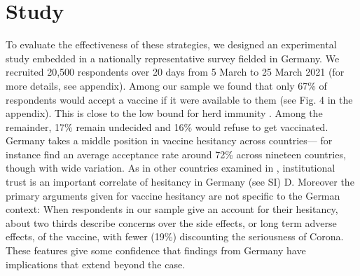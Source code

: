 \documentclass[12pt]{article}
\renewcommand\hl[1]{#1}
\begin{document}
\section*{Study}
To evaluate the effectiveness of these strategies, we designed an experimental study embedded in a nationally representative survey fielded in Germany. We recruited 20,500 respondents over 20 days from 5 March to 25 March 2021 (for more details, see appendix). Among our sample we found that only 67\% of respondents would accept a vaccine if it were available to them (see Fig. 4 in the appendix). This is close to the low bound for herd immunity \cite{Randolph2020}. Among the remainder, 17\% remain undecided and 16\% would refuse to get vaccinated. Germany takes a middle position in vaccine hesitancy across countries---\cite{Lazarus2020} for instance find an average acceptance rate around 72\% across nineteen countries, though with wide variation. As in other countries examined in \cite{Lazarus2020}, institutional trust is an important correlate of hesitancy in Germany (see SI) D. Moreover the primary arguments given for vaccine hesitancy are not specific to the German context: %
\hl{When respondents in our sample give an account for their hesitancy, about two thirds describe concerns over the side effects, or long term adverse effects, of the vaccine, with fewer (19\%) discounting the seriousness of Corona.}  These features give some confidence that findings from Germany have implications that extend beyond the case. 

 



\end{document}
